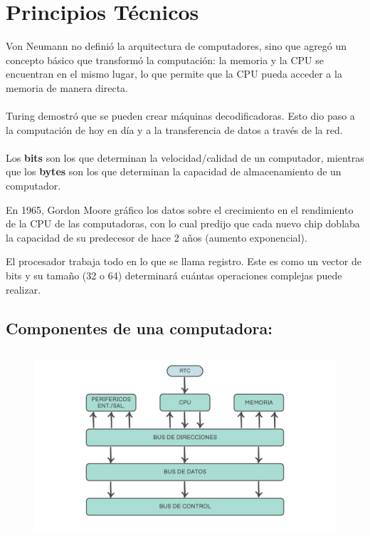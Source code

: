 \documentclass{templateNote}
\begin{document}
\section*{Principios Técnicos}
\noindent Von Neumann no definió la arquitectura de computadores, sino que agregó un concepto básico que transformó la computación: la memoria y la CPU se encuentran en el mismo lugar, lo que permite que la CPU pueda acceder a la memoria de manera directa. 
\\\\
Turing demostró que se pueden crear máquinas decodificadoras. Esto dio paso a la computación de hoy en día y a la transferencia de datos a través de la red.
\\\\
Los \textbf{bits} son los que determinan la velocidad/calidad de un computador, mientras que los \textbf{bytes} son los que determinan la capacidad de almacenamiento de un computador.

\begin{tcolorbox}[colback=blue!5!white,colframe=blue!75!black,title=Ley de Moore]
En 1965, Gordon Moore gráfico los datos sobre el crecimiento en el rendimiento de la CPU de las computadoras, con lo cual predijo que cada nuevo chip doblaba la capacidad de su predecesor de hace 2 años (aumento exponencial).
\end{tcolorbox}

\noindent El procesador trabaja todo en lo que se llama registro. Este es como un vector de bits y su tamaño (32 o 64) determinará cuántas operaciones complejas puede realizar.
\subsection*{\textbf{Componentes de una computadora:}} 
\begin{figure}[H]
    \centering
    \includegraphics[height=7cm]{img/compubasica.png}
\end{figure}
\end{document}

